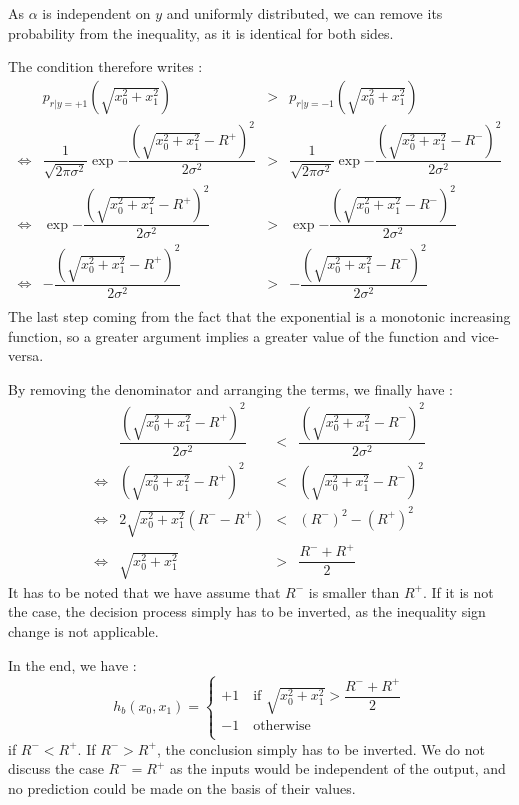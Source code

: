 As $\alpha$ is independent on $y$ and uniformly distributed, we can remove its probability from the inequality, as it is identical for both sides.\par
The condition therefore writes :
$$
\begin{array}{cccc}
    & p_{r| y = +1}(\sqrt{x_0^2 + x_1^2}) & > & p_{r| y = -1}(\sqrt{x_0^2 + x_1^2})\\
    \iff & \dfrac{1}{\sqrt{2\pi\sigma^2}}\exp{-\dfrac{(\sqrt{x_0^2 + x_1^2} - R^+)^2}{2\sigma^2}} & > & \dfrac{1}{\sqrt{2\pi\sigma^2}}\exp{-\dfrac{(\sqrt{x_0^2 + x_1^2} - R^-)^2}{2\sigma^2}}\\
    \iff & \exp{-\dfrac{(\sqrt{x_0^2 + x_1^2} - R^+)^2}{2\sigma^2}} & > & \exp{-\dfrac{(\sqrt{x_0^2 + x_1^2} - R^-)^2}{2\sigma^2}}\\
    \iff & -\dfrac{(\sqrt{x_0^2 + x_1^2} - R^+)^2}{2\sigma^2} & > & -\dfrac{(\sqrt{x_0^2 + x_1^2} - R^-)^2}{2\sigma^2}\\
\end{array}
$$
The last step coming from the fact that the exponential is a monotonic increasing function, so a greater argument implies a greater value of the function and vice-versa.\par
By removing the denominator and arranging the terms, we finally have : 
$$
\begin{array}{cccc}
   &  \dfrac{(\sqrt{x_0^2 + x_1^2} - R^+)^2}{2\sigma^2} & < & \dfrac{(\sqrt{x_0^2 + x_1^2} - R^-)^2}{2\sigma^2}\\
   \iff & (\sqrt{x_0^2 + x_1^2} - R^+)^2 & < & (\sqrt{x_0^2 + x_1^2} - R^-)^2\\
   \iff & 2\sqrt{x_0^2 + x_1^2} (R^--R^+) & < & (R^-)^2 - (R^+)^2\\
   \iff & \sqrt{x_0^2 + x_1^2} & > & \dfrac{R^- + R^+}{2}
\end{array}
$$
It has to be noted that we have assume that $R^-$ is smaller than $R^+$. If it is not the case, the decision process simply has to be inverted, as the inequality sign change is not applicable.\par
In the end, we have : 
$$
h_b(x_0, x_1) = \begin{cases}
    +1 \quad \text{if }\sqrt{x_0^2 + x_1^2}  > \dfrac{R^- + R^+}{2}\\
    -1 \quad \text{otherwise}\\
\end{cases}
$$
if $R^- < R^+$. If $R^- > R^+$, the conclusion simply has to be inverted. We do not discuss the case $R^- = R^+$ as the inputs would be independent of the output, and no prediction could be made on the basis of their values. 

